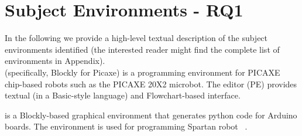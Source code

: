 \section{Subject Environments - RQ1}\label{sec:environments}


 






In the following we provide a high-level textual description of the  subject environments identified (the interested reader might find the complete list of environments in Appendix).\\
\parhead{\picaxe} (specifically, Blockly for Picaxe) is a programming environment for PICAXE chip-based robots such as the PICAXE 20X2 microbot. The \picaxe editor (PE) provides textual (in a Basic-style language) and Flowchart-based interface.  %



\parhead{\ardublockly} is a Blockly-based graphical environment that generates python code for Arduino boards. The environment is used for programming Spartan robot ~\cite{Spartan}.%

